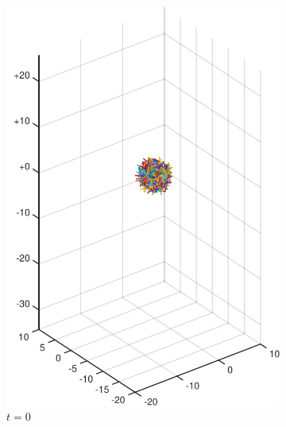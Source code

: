 \documentclass[a4paper,11pt]{kth-mag}
\begin{document}
\begin{figure}[!htbp]
  \centering
  \begin{subfigure}[h]{0.45\textwidth}
    \centering
    \includegraphics[width=\textwidth]{img/sphere_00000.pdf}
    \caption{$t=0$}\label{fig:sphere_simulation_1a}
  \end{subfigure}
  \begin{subfigure}[h]{0.45\textwidth}
    \centering

\end{subfigure}
\end{figure}
\end{document}
